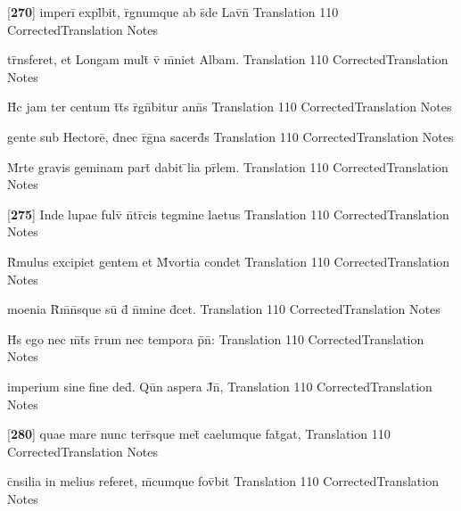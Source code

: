 \documentclass[]{book}
\begin{document}
\latline
  {[\textbf{270}] imperi\={} expl\={}bit, r\={}gnumque ab s\={}de Lav\={\macron {\i}}n\={\macron {\i}}}
  { Translation }
  {110}
  { CorrectedTranslation }
  { Notes }


\latline
  {tr\={}nsferet, et Longam mult\={} v\={\macron {\i}} m\={}niet Albam.}
  { Translation }
  {110}
  { CorrectedTranslation }
  { Notes }


\latline
  {H\={\macron {\i}}c jam ter centum t\={}t\={}s r\={}gn\={}bitur ann\={}s }
  { Translation }
  {110}
  { CorrectedTranslation }
  { Notes }


\latline
  {gente sub Hectore\={}, d\={}nec r\={}g\={\macron {\i}}na sacerd\={}s}
  { Translation }
  {110}
  { CorrectedTranslation }
  { Notes }


\latline
  {M\={}rte gravis geminam part\={} dabit \={}lia pr\={}lem.}
  { Translation }
  {110}
  { CorrectedTranslation }
  { Notes }


\latline
  {[\textbf{275}] Inde lupae fulv\={} n\={}tr\={\macron {\i}}cis tegmine laetus}
  { Translation }
  {110}
  { CorrectedTranslation }
  { Notes }


\latline
  {R\={}mulus excipiet gentem et M\={}vortia condet}
  { Translation }
  {110}
  { CorrectedTranslation }
  { Notes }


\latline
  {moenia R\={}m\={}n\={}sque su\={} d\={} n\={}mine d\={\macron {\i}}cet.}
  { Translation }
  {110}
  { CorrectedTranslation }
  { Notes }


\latline
  {H\={\macron {\i}}s ego nec m\={}t\={}s r\={}rum nec tempora p\={}n\={}:}
  { Translation }
  {110}
  { CorrectedTranslation }
  { Notes }


\latline
  {imperium sine fine ded\={\macron {\i}}.  Qu\={\macron {\i}}n aspera J\={}n\={},}
  { Translation }
  {110}
  { CorrectedTranslation }
  { Notes }


\latline
  {[\textbf{280}] quae mare nunc terr\={}sque met\={} caelumque fat\={\macron {\i}}gat,}
  { Translation }
  {110}
  { CorrectedTranslation }
  { Notes }


\latline
  {c\={}nsilia in melius referet, m\={}cumque fov\={}bit}
  { Translation }
  {110}
  { CorrectedTranslation }
  { Notes }
\end{document}
